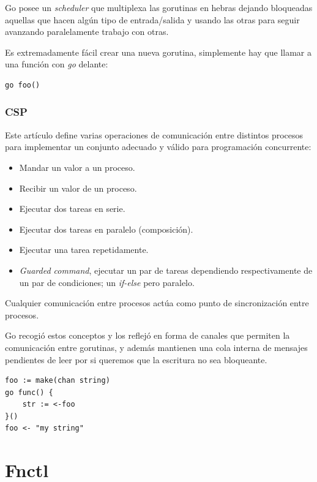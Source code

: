 Go posee un \emph{scheduler} que multiplexa las gorutinas en hebras\cite{morsing2013} dejando bloqueadas aquellas que hacen algún tipo de entrada/salida y usando las otras para seguir avanzando paralelamente trabajo con otras.

Es extremadamente fácil crear una nueva gorutina, simplemente hay que llamar a una función con \emph{go} delante:

\begin{verbatim}
go foo()
\end{verbatim}

\subsubsection{CSP}

Este artículo define varias operaciones de comunicación\cite{robpike2010} entre distintos procesos para implementar un conjunto adecuado y válido para programación concurrente:
\begin{itemize}
    \item Mandar un valor a un proceso.
    \item Recibir un valor de un proceso.
    \item Ejecutar dos tareas en serie.
    \item Ejecutar dos tareas en paralelo (composición).
    \item Ejecutar una tarea repetidamente.
    \item \emph{Guarded command}, ejecutar un par de tareas dependiendo respectivamente de un par de condiciones; un \emph{if-else} pero paralelo.
\end{itemize}

Cualquier comunicación entre procesos actúa como punto de sincronización entre procesos.

Go recogió estos conceptos y los reflejó en forma de canales que permiten la comunicación entre gorutinas, y además mantienen una cola interna de mensajes pendientes de leer por si queremos que la escritura no sea bloqueante.

\begin{verbatim}
foo := make(chan string)
go func() {
    str := <-foo
}()
foo <- "my string"
\end{verbatim}

\section{Fnctl}

